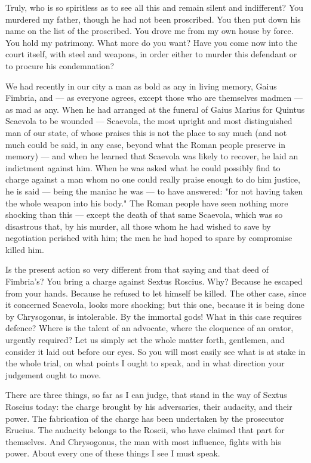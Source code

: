  Truly, who is so spiritless as to see all this and remain silent and indifferent? You murdered my father, though he had not been proscribed. You then put down his name on the list of the proscribed. You drove me from my own house by force. You hold my patrimony. What more do you want? Have you come now into the court itself, with steel and weapons, in order either to murder this defendant or to procure his condemnation?

 We had recently in our city a man as bold as any in living memory, Gaius Fimbria, and --- as everyone agrees, except those who are themselves madmen --- as mad as any. When he had arranged at the funeral of Gaius Marius for Quintus Scaevola to be wounded --- Scaevola, the most upright and most distinguished man of our state, of whose praises this is not the place to say much (and not much could be said, in any case, beyond what the Roman people preserve in memory) --- and when he learned that Scaevola was likely to recover, he laid an indictment against him. When he was asked what he could possibly find to charge against a man whom no one could really praise enough to do him justice, he is said --- being the maniac he was --- to have answered: "for not having taken the whole weapon into his body." The Roman people have seen nothing more shocking than this --- except the death of that same Scaevola, which was so disastrous that, by his murder, all those whom he had wished to save by negotiation perished with him; the men he had hoped to spare by compromise killed him.

 Is the present action so very different from that saying and that deed of Fimbria's? You bring a charge against Sextus Roscius. Why? Because he escaped from your hands. Because he refused to let himself be killed. The other case, since it concerned Scaevola, looks more shocking; but this one, because it is being done by Chrysogonus, is intolerable. By the immortal gods! What in this case requires defence? Where is the talent of an advocate, where the eloquence of an orator, urgently required? Let us simply set the whole matter forth, gentlemen, and consider it laid out before our eyes. So you will most easily see what is at stake in the whole trial, on what points I ought to speak, and in what direction your judgement ought to move.

 There are three things, so far as I can judge, that stand in the way of Sextus Roscius today: the charge brought by his adversaries, their audacity, and their power. The fabrication of the charge has been undertaken by the prosecutor Erucius. The audacity belongs to the Roscii, who have claimed that part for themselves. And Chrysogonus, the man with most influence, fights with his power. About every one of these things I see I must speak.

